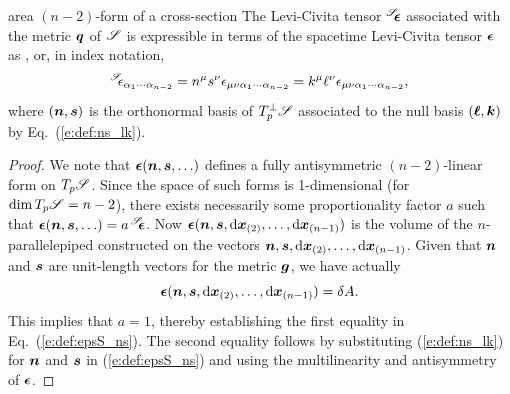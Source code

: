 \begin{tprop}{area $(n-2)$-form of a cross-section}{}
The Levi-Civita tensor ${}^{\mathscr{S}}\!\!\bm{\epsilon}$ associated with the metric $\bm{q}$ of $\mathscr{S}$
is expressible in terms of the spacetime Levi-Civita tensor
$\bm{\epsilon}$ as
\be \label{e:def:epsS_ns}
    ,
\ee
or, in index notation,
\[
    {}^{\mathscr{S}}\!\!\epsilon_{\alpha_1\cdots\alpha_{n-2}} = n^\mu s^\nu \epsilon_{\mu\nu\alpha_1\cdots\alpha_{n-2}}
    = k^\mu \ell^\nu \epsilon_{\mu\nu\alpha_1\cdots\alpha_{n-2}} ,
\]
where $(\bm{n},\bm{s})$ is the orthonormal basis of $T_p^\perp\mathscr{S}$ associated to the
null basis $(\bm{\ell}, \bm{k})$ by Eq.~(\ref{e:def:ns_lk}).
\end{tprop}

\begin{proof}
We note that $\bm{\epsilon}(\bm{n},\bm{s},\ldots)$
defines a fully antisymmetric $(n-2)$-linear form on $T_p\mathscr{S}$. Since the space
of such forms is 1-dimensional (for $\dim T_p\mathscr{S} = n-2$), there exists necessarily
some proportionality factor $a$ such that
$\bm{\epsilon}(\bm{n},\bm{s},\ldots) = a \, {}^{\mathscr{S}}\!\!\bm{\epsilon}$. Now
$\bm{\epsilon}(\bm{n},\bm{s},\mathrm{d}\bm{x}_{(2)},\ldots,\mathrm{d}\bm{x}_{(n-1)})$ is the volume
of the $n$-parallelepiped constructed on the vectors $\bm{n},\bm{s},\mathrm{d}\bm{x}_{(2)},\ldots,\mathrm{d}\bm{x}_{(n-1)}$.
Given that $\bm{n}$ and $\bm{s}$ are unit-length vectors for the metric $\bm{g}$,
we have actually
\[
    \bm{\epsilon}(\bm{n},\bm{s},\mathrm{d}\bm{x}_{(2)},\ldots,\mathrm{d}\bm{x}_{(n-1)}) = \delta A.
\]
This implies that $a=1$, thereby establishing the first equality
in Eq.~(\ref{e:def:epsS_ns}). The second equality follows by substituting (\ref{e:def:ns_lk})
for $\bm{n}$ and $\bm{s}$ in (\ref{e:def:epsS_ns}) and using the multilinearity
and antisymmetry of $\bm{\epsilon}$.
\end{proof}

